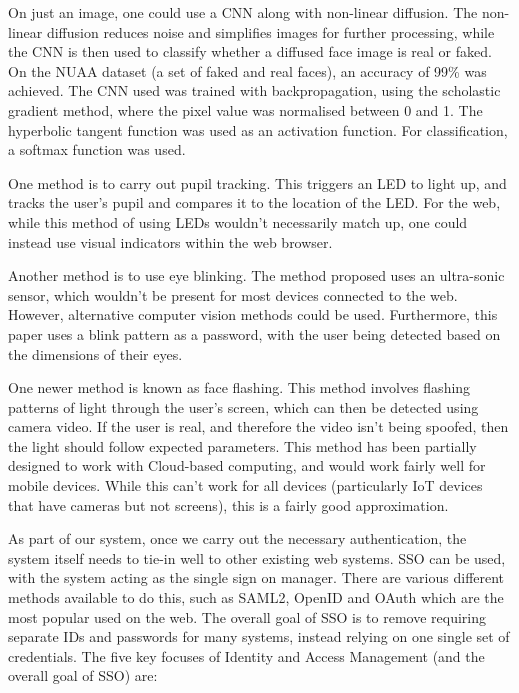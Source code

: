 \documentclass[14pt]{article}
\begin{document}
On just an image, one could use a CNN along with non-linear diffusion. The non-linear diffusion reduces noise and
simplifies images for further processing, while the CNN is then used to classify whether a diffused face image
is real or faked. On the NUAA dataset (a set of faked and real faces), an accuracy of 99\% was achieved. The CNN
used was trained with backpropagation, using the scholastic gradient method, where the pixel value was normalised between
0 and 1. The hyperbolic tangent function was used as an activation function. For classification, a softmax function was
used. 
\cite{LivenessTestNonLinearDiffusion}

One method is to carry out pupil tracking. This triggers an LED to light up, and tracks the user's pupil and
compares it to the location of the LED.
\cite{LivenessTestPupilTracking} For the web, while this method of using LEDs wouldn't necessarily match up,
one could instead use visual indicators within the web browser. 

Another method is to use eye blinking. The method proposed uses an ultra-sonic sensor,
which wouldn't be present for most devices connected to the web. However, alternative computer vision methods could be used.
Furthermore, this paper uses a blink pattern as a password, with the user being detected based on the dimensions of their eyes.\cite{LivenessTestBlinking}

One newer method is known as face flashing. This method involves flashing patterns of light through the user's screen,
which can then be detected using camera video. If the user is real, and therefore the video isn't being spoofed, then
the light should follow expected parameters. This method has been partially designed to work with Cloud-based computing,
and would work fairly well for mobile devices. \cite{LivenessTestFaceFlashing} While this can't work for all devices (particularly IoT devices that have
cameras but not screens), this is a fairly good approximation. 


As part of our system, once we carry out the necessary authentication, the system itself needs to tie-in well to
other existing web systems. SSO can be used, with the system acting as the single sign on manager. There are various
different methods available to do this, such as SAML2, OpenID and OAuth which are the most popular used on the web. 
The overall goal of SSO is to remove requiring separate IDs and passwords for many systems, instead relying on one single
set of credentials. The five key focuses of Identity and Access Management (and the overall goal of SSO) are:
\end{document}
